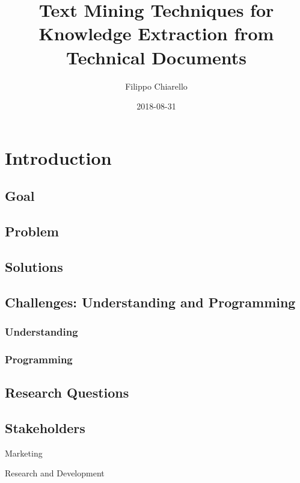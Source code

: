 \documentclass[]{book}
\title{Text Mining Techniques for Knowledge Extraction from Technical Documents}
\author{Filippo Chiarello}
\date{2018-08-31}
\theoremstyle{definition}
\theoremstyle{definition}
\theoremstyle{definition}
\theoremstyle{remark}
\begin{document}
\maketitle

{
\setcounter{tocdepth}{1}
\tableofcontents
}
\chapter{Introduction}\label{introduction}

\section{Goal}\label{goal}

\section{Problem}\label{problem}

\section{Solutions}\label{solutions}

\section{Challenges: Understanding and
Programming}\label{challenges-understanding-and-programming}

\subsection{Understanding}\label{understanding}

\subsection{Programming}\label{programming}

\section{Research Questions}\label{research-questions}

\section{Stakeholders}\label{stakeholders}

Marketing

Research and Development
\end{document}

